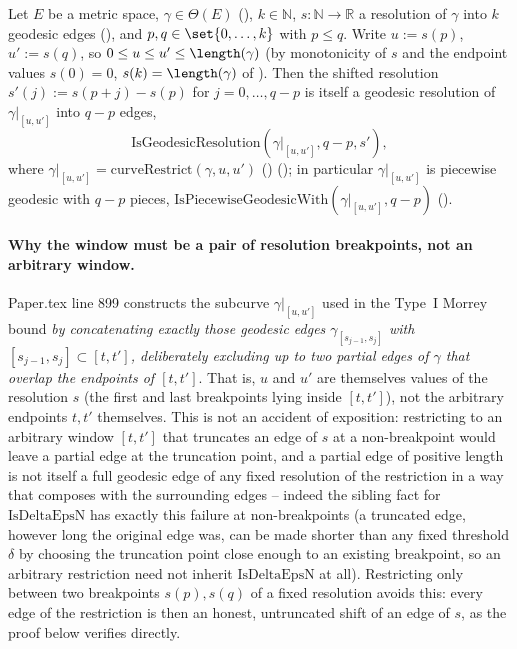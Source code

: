 \begin{lemma}
  Let $E$ be a metric space, $\gamma \in \Theta(E)$ (), $k \in \mathbb{N}$, $s \colon
  \mathbb{N} \to \mathbb{R}$ a resolution of $\gamma$ into $k$ geodesic edges
  (), and $p,q \in \set{0,\dots,k}$ with $p \le q$. Write $u := s(p)$,
  $u' := s(q)$, so $0 \le u \le u' \le \length(\gamma)$ (by monotonicity of $s$ and the endpoint
  values $s(0)=0$, $s(k)=\length(\gamma)$ of ). Then the shifted
  resolution $s'(j) := s(p+j) - s(p)$ for $j = 0,\dots,q-p$ is itself a geodesic resolution of
  $\gamma|_{[u,u']}$ into $q-p$ edges,
  \[
    \mathrm{IsGeodesicResolution}(\gamma|_{[u,u']}, q-p, s')
    ,
  \]
  where $\gamma|_{[u,u']} = \mathrm{curveRestrict}(\gamma,u,u')$ ()
  (); in particular $\gamma|_{[u,u']}$ is piecewise geodesic with
  $q-p$ pieces, $\mathrm{IsPiecewiseGeodesicWith}(\gamma|_{[u,u']}, q-p)$
  ().

  \paragraph{Why the window must be a pair of resolution breakpoints, not an arbitrary window.}
  Paper.tex line 899 constructs the subcurve $\gamma|_{[u,u']}$ used in the Type~I Morrey bound
  \emph{by concatenating exactly those geodesic edges $\gamma_{[s_{j-1},s_j]}$ with
  $[s_{j-1},s_j]\subset[t,t']$, deliberately excluding up to two partial edges of $\gamma$ that
  overlap the endpoints of $[t,t']$}. That is, $u$ and $u'$ are themselves values of the resolution
  $s$ (the first and last breakpoints lying inside $[t,t']$), not the arbitrary endpoints $t,t'$
  themselves. This is not an accident of exposition: restricting to an arbitrary window $[t,t']$
  that truncates an edge of $s$ at a non-breakpoint would leave a partial edge at the truncation
  point, and a partial edge of positive length is not itself a full geodesic edge of any fixed
  resolution of the restriction in a way that composes with the surrounding edges -- indeed the
  sibling fact for $\mathrm{IsDeltaEpsN}$ has exactly this failure at non-breakpoints (a truncated
  edge, however long the original edge was, can be made shorter than any fixed threshold $\delta$
  by choosing the truncation point close enough to an existing breakpoint, so an arbitrary
  restriction need not inherit $\mathrm{IsDeltaEpsN}$ at all). Restricting only between two
  breakpoints $s(p),s(q)$ of a fixed resolution avoids this: every edge of the restriction is then
  an honest, untruncated shift of an edge of $s$, as the proof below verifies directly.


\end{lemma}
